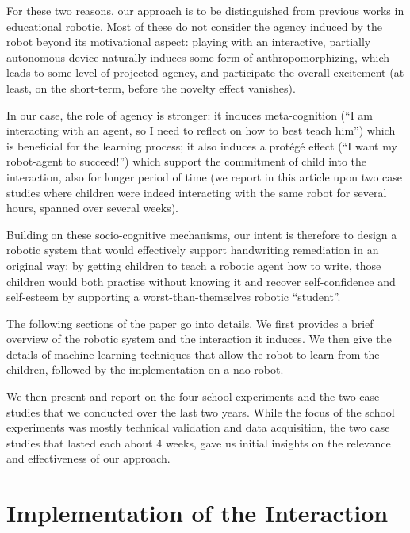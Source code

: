 \documentclass{article}
\begin{document}
For these two reasons, our approach is to be distinguished from previous works in
educational robotic. Most of these do not consider the agency induced by the
robot beyond its motivational aspect: playing with an interactive, partially autonomous
device naturally induces some form of anthropomorphizing, which leads to some
level of projected agency, and participate the overall excitement (at least, on
the short-term, before the novelty effect vanishes).

In our case, the role of agency is stronger: it induces meta-cognition (``I am
interacting with an agent, so I need to reflect on how to best teach him'')
which is beneficial for the learning process; it also induces a prot\'eg\'e
effect (``I want my robot-agent to succeed!'') which support the commitment of
child into the interaction, also for longer period of time (we report in this
article upon two case studies where children were indeed interacting with the
same robot for several hours, spanned over several weeks).


Building on these socio-cognitive mechanisms, our intent is therefore to design
a robotic system that would effectively support handwriting remediation in an
original way: by getting children to teach a robotic agent how to write, those
children would both practise without knowing it and recover self-confidence and
self-esteem by supporting a worst-than-themselves robotic ``student''.

The following sections of the paper go into details. We first provides a
brief overview of the robotic system and the interaction it induces. We then
give the details of machine-learning techniques that allow the robot to learn
from the children, followed by the implementation on a {\sc nao} robot.

We then present and report on the four school experiments and the two case
studies that we conducted over the last two years. While the focus of the school
experiments was mostly technical validation and data acquisition, the two case
studies that lasted each about 4 weeks, gave us initial insights on the
relevance and effectiveness of our approach.

\section{Implementation of the Interaction}
\end{document}
